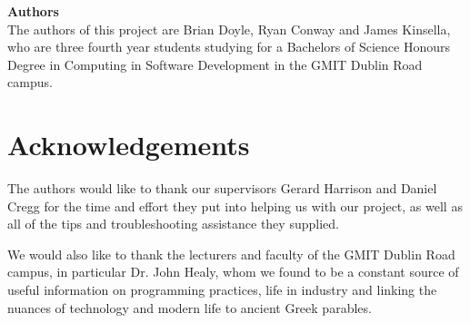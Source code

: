 
\vspace{20mm}
\begin{center}
\large\textbf{Authors}
\\
The authors of this project are Brian Doyle, Ryan Conway and James Kinsella, who are three fourth year students studying for a Bachelors of Science Honours Degree in Computing in Software Development in the GMIT Dublin Road campus.
\\
\end{center}

\section{Acknowledgements}

The authors would like to thank our supervisors Gerard Harrison and Daniel Cregg for the time and effort they put into helping us with our project, as well as all of the tips and troubleshooting assistance they supplied.

We would also like to thank the lecturers and faculty of the GMIT Dublin Road campus, in particular Dr. John Healy, whom we found to be a constant source of useful information on programming practices, life in industry and linking the nuances of technology and modern life to ancient Greek parables.

